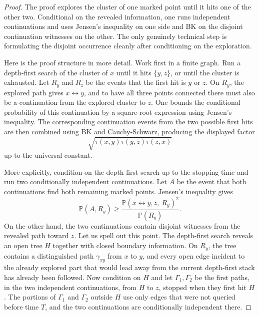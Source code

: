 \documentclass[11pt,reqno]{book}
\numberwithin{equation}{chapter}
\theoremstyle{plain}
\theoremstyle{definition}
\theoremstyle{remark}
\renewcommand{\P}{\mathbb P}
\newcommand{\1}{\mathbf 1}
\begin{document}
\begin{proof}
The proof explores the cluster of one marked point until it hits one of the other two. Conditional on the revealed information, one runs independent continuations and uses Jensen's inequality on one side and BK on the disjoint continuation witnesses on the other. The only genuinely technical step is formulating the disjoint occurrence cleanly after conditioning on the exploration.

Here is the proof structure in more detail. Work first in a finite graph. Run a depth-first search of the cluster of $x$ until it hits $\{y,z\}$, or until the cluster is exhausted. Let $R_y$ and $R_z$ be the events that the first hit is $y$ or $z$. On $R_y$, the explored path gives $x\leftrightarrow y$, and to have all three points connected there must also be a continuation from the explored cluster to $z$. One bounds the conditional probability of this continuation by a square-root expression using Jensen's inequality. The corresponding continuation events from the two possible first hits are then combined using BK and Cauchy-Schwarz, producing the displayed factor
\[
  \sqrt{\tau(x,y)\tau(y,z)\tau(z,x)}
\]
up to the universal constant.

More explicitly, condition on the depth-first search up to the stopping time and run two conditionally independent continuations. Let $A$ be the event that both continuations find both remaining marked points. Jensen's inequality gives
\[
  \P(A,R_y)
  \geq
  \frac{\P(x\leftrightarrow y,z,\ R_y)^2}{\P(R_y)}.
\]
On the other hand, the two continuations contain disjoint witnesses from the revealed path toward $z$. Let us spell out this point. The depth-first search reveals an open tree \(H\) together with closed boundary information. On \(R_y\), the tree contains a distinguished path \(\gamma_{xy}\) from \(x\) to \(y\), and every open edge incident to the already explored part that would lead away from the current depth-first stack has already been followed. Now condition on \(H\) and let \(\Gamma_1,\Gamma_2\) be the first paths, in the two independent continuations, from \(H\) to \(z\), stopped when they first hit \(H\). The portions of \(\Gamma_1\) and \(\Gamma_2\) outside \(H\) use only edges that were not queried before time \(T\), and the two continuations are conditionally independent there.


\end{proof}
\end{document}
